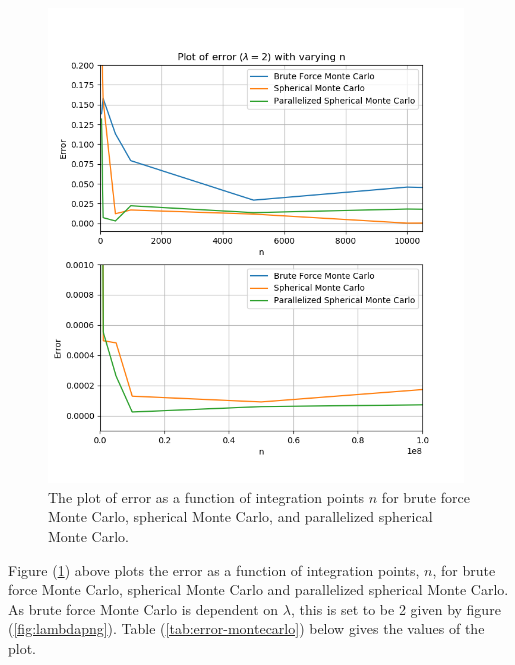 \documentclass{article}
\begin{document}
  \begin{figure}[ht]
    \centering
    \includegraphics[width = 11cm]{images/error-montecarlo.png}
    \caption{The plot of error as a function of integration points $n$ for brute force Monte Carlo, spherical Monte Carlo, and parallelized spherical Monte Carlo. }
    \label{fig:montecarlopng}
  \end{figure}

  Figure (\ref{fig:montecarlopng}) above plots the error as a function of integration points, $n$, for brute force Monte Carlo, spherical Monte Carlo and parallelized spherical Monte Carlo. As brute force Monte Carlo is dependent on $\lambda$, this is set to be 2 given by figure (\ref{fig:lambdapng}). Table (\ref{tab:error-montecarlo}) below gives the values of the plot. \\
\end{document}
